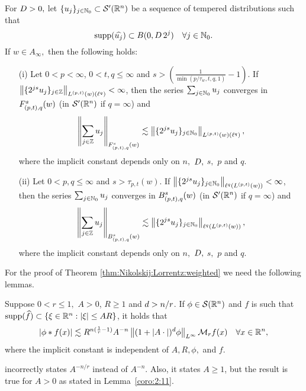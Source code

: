 {\begin{theorem}\label{thm:Nikolskij:Lorrentz:weighted} For $\A> 0,$ let $\{u_j\}_{j \in \naz} \subset \mathcal{S}'(\rn)$ be a sequence of tempered distributions such that
\begin{equation*}
\supp(\widehat{u_j}) \subset B(0, \A\, 2^j ) \quad \forall j \in \naz.
\end{equation*}
If $w\in A_\infty,$ then the following holds:  
\begin{enumerate}
\item[(i)]\label{item:thh:Nikolskij:Lorrentz:TL} Let $0 < p < \infty$, $0 < t,q \leq \infty$ and $s > \left(\frac{1}{\min(p/\tau_w,t,q,1)} - 1 \right)$. If $\norm{\{2^{js} u_j\}_{j\in\ent}}{L^{(p,t)}(w)(\ell^{q})} < \infty$, then the series $\sum_{j \in \naz} u_j$ converges in $\itlw{(p,t)}{s}{q}{w}$ (in $\mathcal{S}'(\rn)$ if $q=\infty$) and 
\begin{equation*}
\norm{\sum_{j \in \ent} u_j}{\itlw{(p,t)}{s}{q}{w}} \lesssim  \norm{\{2^{js} u_j\}_{j\in\naz}}{L^{(p,t)}(w)(\ell^{q})},
\end{equation*}
where the implicit constant depends only on $n,$ $\A,$ $s,$ $p$ and  $q.$
\item[(ii)]\label{item:thh:Nikolskij:Lorrentz:B} Let $0 < p, q \leq \infty$ and $s > \tau_{p,t}(w)$. If $\norm{\{2^{js} u_j\}_{j\in\naz}}{\ell^{q}(L^{(p,t)}(w))} < \infty$, then the series $\sum_{j \in \naz} u_j$ converges in  $\ibesw{(p,t)}{s}{q}{w}$ (in $\mathcal{S}'(\rn)$ if $q=\infty$) and 
\begin{equation*}
\norm{\sum_{j \in \ent} u_j}{\ibesw{(p,t)}{s}{q}{w}} \lesssim  \norm{\{2^{js} u_j\}_{j\in\naz}}{\ell^{q}(L^{(p,t)}(w))},
\end{equation*}
where the implicit constant depends only on $n,$ $\A,$ $s,$ $p$ and $q.$
\end{enumerate}
\end{theorem}
For the proof of Theorem \ref{thm:Nikolskij:Lorrentz:weighted} we need the following lemmas.

\begin{lemma}\label{coro:2:11}
Suppose $0 < r \leq 1,$  $A >0$, $R \geq 1$ and $\ex > n/r$. If $\phi \in \sw$ and $f$ is such that  $\supp(\widehat{f}) \subset \{\xi\in\rn:\abs{\xi}\le AR\}$, it holds that
\begin{equation*}
|\phi * f(x)| \lesssim R^{n (\frac{1}{r}  -1)} A^{-n} \norm{(1 + |A \cdot|)^\ex \phi}{L^\infty}  \M_rf(x) \quad \forall x \in \rn,
\end{equation*}
where the implicit constant is independent of $A, R, \phi,$ and $f.$  
\end{lemma}
\begin{remark} \cite[Corollary 2.11]{MR837335} incorrectly states $A^{-n/r}$ instead of $ A^{-n}$. Also, it states $A \geq 1$, but the result is true for $A >0$ as stated in Lemma~\ref{coro:2:11}.
\end{remark}

}
